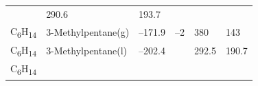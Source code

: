 \documentclass[
]{book}
\theoremstyle{definition}
\theoremstyle{definition}
\theoremstyle{definition}
\theoremstyle{remark}
\begin{document}
\begin{longtable}[]{@{}llllll@{}}
\begin{minipage}[t]{0.15\columnwidth}
\strut
\end{minipage} & \begin{minipage}[t]{0.14\columnwidth}\raggedright
290.6\strut
\end{minipage} & \begin{minipage}[t]{0.14\columnwidth}\raggedright
193.7\strut
\end{minipage}\tabularnewline
\begin{minipage}[t]{0.07\columnwidth}\raggedright
C\textsubscript{6}H\textsubscript{14}\strut
\end{minipage} & \begin{minipage}[t]{0.17\columnwidth}\raggedright
3-Methylpentane(g)\strut
\end{minipage} & \begin{minipage}[t]{0.15\columnwidth}\raggedright
--171.9\strut
\end{minipage} & \begin{minipage}[t]{0.15\columnwidth}\raggedright
--2\strut
\end{minipage} & \begin{minipage}[t]{0.14\columnwidth}\raggedright
380\strut
\end{minipage} & \begin{minipage}[t]{0.14\columnwidth}\raggedright
143\strut
\end{minipage}\tabularnewline
\begin{minipage}[t]{0.07\columnwidth}\raggedright
C\textsubscript{6}H\textsubscript{14}\strut
\end{minipage} & \begin{minipage}[t]{0.17\columnwidth}\raggedright
3-Methylpentane(l)\strut
\end{minipage} & \begin{minipage}[t]{0.15\columnwidth}\raggedright
--202.4\strut
\end{minipage} & \begin{minipage}[t]{0.15\columnwidth}\raggedright
\strut
\end{minipage} & \begin{minipage}[t]{0.14\columnwidth}\raggedright
292.5\strut
\end{minipage} & \begin{minipage}[t]{0.14\columnwidth}\raggedright
190.7\strut
\end{minipage}\tabularnewline
\begin{minipage}[t]{0.07\columnwidth}\raggedright
C\textsubscript{6}H\textsubscript{14}\strut
\end{minipage} & \begin{minipage}[t]{0.17\columnwidth}\raggedright

\end{minipage}
\end{longtable}
\end{document}
